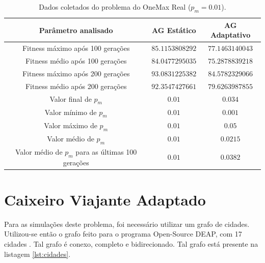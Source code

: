 \begin{table}
\caption{Dados coletados do problema do OneMax Real ($p_m = 0.01$).}
\label{tab:onemax_real}

\center
\begin{tabular}{ccc}
	\hline
	Parâmetro analisado 								& AG Estático		& AG Adaptativo   \\
	\hline
	Fitness máximo após 100 gerações					& $85.1153808292$	& $77.1463140043$	\\
	Fitness médio após 100 gerações						& $84.0477295035$	& $75.2878839218$	\\
	Fitness máximo após 200 gerações 					& $93.0831225382$	& $84.5782329066$	\\
	Fitness médio após 200 gerações 					& $92.3547427661$	& $79.6263987855$	\\
	Valor final de $p_m$								& $0.01$ 			& $0.034$	\\
	Valor mínimo de $p_m$								& $0.01$			& $0.001$	\\
	Valor máximo de $p_m$								& $0.01$			& $0.05$	\\
	Valor médio de $p_m$								& $0.01$			& $0.0215$	\\
	Valor médio de $p_m$ para as últimas 100 gerações	& $0.01$			& $0.0382$	\\
	\hline
\end{tabular}
\end{table}

\section{Caixeiro Viajante Adaptado}

Para as simulações deste problema, foi necessário utilizar um grafo de cidades. Utilizou-se então o grafo feito para o programa Open-Source DEAP, com 17 cidades \cite{DEAP_JMLR2012, deap2016tsp}. Tal grafo é conexo, completo e bidirecionado. Tal grafo está presente na listagem \ref{lst:cidades}.

